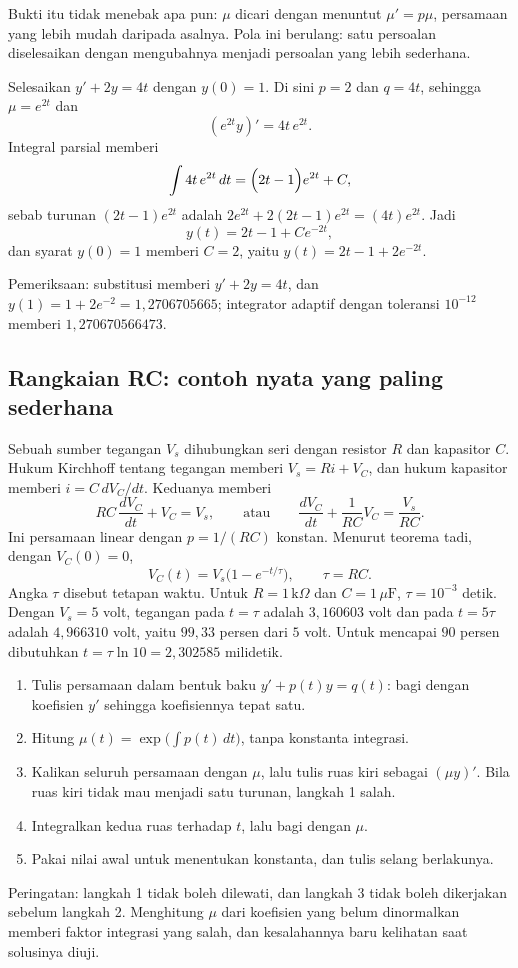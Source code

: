 Bukti itu tidak menebak apa pun: $\mu$ dicari dengan menuntut $\mu'=p\mu$,
persamaan yang lebih mudah daripada asalnya. Pola ini berulang: satu persoalan
diselesaikan dengan mengubahnya menjadi persoalan yang lebih sederhana.

\begin{contoh}
Selesaikan $y'+2y=4t$ dengan $y(0)=1$. Di sini $p=2$ dan $q=4t$, sehingga
$\mu=e^{2t}$ dan
\[
(e^{2t}y)'=4t\,e^{2t}.
\]
Integral parsial memberi
\[
\int 4t\,e^{2t}\,dt=\Bigl(2t-1\Bigr)e^{2t}+C ,
\]
sebab turunan $(2t-1)e^{2t}$ adalah $2e^{2t}+2(2t-1)e^{2t}=(4t)e^{2t}$. Jadi
\[
y(t)=2t-1+Ce^{-2t},
\]
dan syarat $y(0)=1$ memberi $C=2$, yaitu $y(t)=2t-1+2e^{-2t}$.

Pemeriksaan: substitusi memberi $y'+2y=4t$, dan $y(1)=1+2e^{-2}=1{,}2706705665$;
integrator adaptif dengan toleransi $10^{-12}$ memberi $1{,}270670566473$.
\end{contoh}

\subsection{Rangkaian RC: contoh nyata yang paling sederhana}

Sebuah sumber tegangan $V_{s}$ dihubungkan seri dengan resistor $R$ dan
kapasitor $C$. Hukum Kirchhoff tentang tegangan memberi $V_{s}=Ri+V_{C}$, dan
hukum kapasitor memberi $i=C\,dV_{C}/dt$. Keduanya memberi
\[
RC\,\frac{dV_{C}}{dt}+V_{C}=V_{s},
\qquad\text{atau}\qquad
\frac{dV_{C}}{dt}+\frac{1}{RC}V_{C}=\frac{V_{s}}{RC}.
\]
Ini persamaan linear dengan $p=1/(RC)$ konstan. Menurut teorema tadi, dengan
$V_{C}(0)=0$,
\[
V_{C}(t)=V_{s}\bigl(1-e^{-t/\tau}\bigr),\qquad \tau=RC .
\]
Angka $\tau$ disebut tetapan waktu. Untuk $R=1\,\mathrm{k}\Omega$ dan
$C=1\,\mu\mathrm{F}$, $\tau=10^{-3}$ detik. Dengan $V_{s}=5$ volt, tegangan
pada $t=\tau$ adalah $3{,}160603$ volt dan pada $t=5\tau$ adalah $4{,}966310$ volt,
yaitu $99{,}33$ persen dari $5$ volt. Untuk mencapai $90$ persen dibutuhkan
$t=\tau\ln10=2{,}302585$ milidetik.

\begin{resep}
\begin{enumerate}
\item Tulis persamaan dalam bentuk baku $y'+p(t)y=q(t)$: bagi dengan koefisien
  $y'$ sehingga koefisiennya tepat satu.
\item Hitung $\mu(t)=\exp\bigl(\int p(t)\,dt\bigr)$, tanpa konstanta integrasi.
\item Kalikan seluruh persamaan dengan $\mu$, lalu tulis ruas kiri sebagai
  $(\mu y)'$. Bila ruas kiri tidak mau menjadi satu turunan, langkah 1 salah.
\item Integralkan kedua ruas terhadap $t$, lalu bagi dengan $\mu$.
\item Pakai nilai awal untuk menentukan konstanta, dan tulis selang berlakunya.
\end{enumerate}
Peringatan: langkah 1 tidak boleh dilewati, dan langkah 3 tidak boleh dikerjakan
sebelum langkah 2. Menghitung $\mu$ dari koefisien yang belum dinormalkan memberi
faktor integrasi yang salah, dan kesalahannya baru kelihatan saat solusinya
diuji.
\end{resep}

